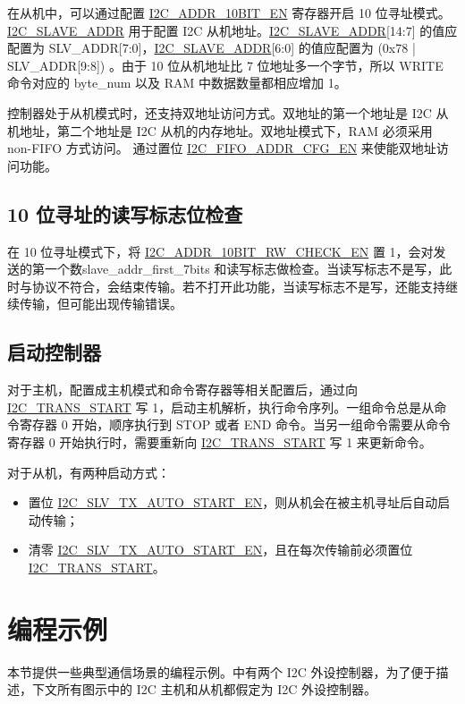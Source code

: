 \documentclass[main\_\_CN.tex]{subfiles}
\begin{document}
在从机中，可以通过配置 \hyperref[fielddesc:I2CADDR10BITEN]{I2C\_ADDR\_10BIT\_EN} 寄存器开启 10 位寻址模式。 \hyperref[fielddesc:I2CSLAVEADDR]{I2C\_SLAVE\_ADDR} 用于配置 I2C 从机地址。\hyperref[fielddesc:I2CSLAVEADDR]{I2C\_SLAVE\_ADDR}[14:7] 的值应配置为 SLV\_ADDR[7:0]，\hyperref[fielddesc:I2CSLAVEADDR]{I2C\_SLAVE\_ADDR}[6:0] 的值应配置为 (0x{}78 | SLV\_ADDR[9:8]) 。由于 10 位从机地址比 7 位地址多一个字节，所以 WRITE 命令对应的 byte\_num 以及 RAM 中数据数量都相应增加 1。

控制器处于从机模式时，还支持双地址访问方式。双地址的第一个地址是 I2C 从机地址，第二个地址是 I2C 从机的内存地址。双地址模式下，RAM 必须采用 non-FIFO 方式访问。
通过置位 \hyperref[fielddesc:I2CFIFOADDRCFGEN]{I2C\_FIFO\_ADDR\_CFG\_EN} 来使能双地址访问功能。

\subsection{10 位寻址的读写标志位检查}
在 10 位寻址模式下，将 \hyperref[fielddesc:I2CADDR10BITRWCHECKEN]{I2C\_ADDR\_10BIT\_RW\_CHECK\_EN} 置 1，会对发送的第一个数slave\_addr\_first\_7bits 和读写标志做检查。当读写标志不是写，此时与协议不符合，会结束传输。若不打开此功能，当读写标志不是写，还能支持继续传输，但可能出现传输错误。

\subsection{启动控制器}
\label{subsubsec:i2c-start}
对于主机，配置成主机模式和命令寄存器等相关配置后，通过向 \hyperref[fielddesc:I2CTRANSSTART]{I2C\_TRANS\_START} 写 1，启动主机解析，执行命令序列。一组命令总是从命令寄存器 0 开始，顺序执行到 STOP 或者 END 命令。当另一组命令需要从命令寄存器 0 开始执行时，需要重新向 \hyperref[fielddesc:I2CTRANSSTART]{I2C\_TRANS\_START} 写 1 来更新命令。

对于从机，有两种启动方式：
\begin{itemize}
    \item 置位 \hyperref[fielddesc:I2CSLVTXAUTOSTARTEN]{I2C\_SLV\_TX\_AUTO\_START\_EN}，则从机会在被主机寻址后自动启动传输；
    \item 清零 \hyperref[fielddesc:I2CSLVTXAUTOSTARTEN]{I2C\_SLV\_TX\_AUTO\_START\_EN}，且在每次传输前必须置位 \hyperref[fielddesc:I2CTRANSSTART]{I2C\_TRANS\_START}。
\end{itemize}

\section{编程示例}
本节提供一些典型通信场景的编程示例。\chipname{}中有两个 I2C 外设控制器，为了便于描述，下文所有图示中的 I2C 主机和从机都假定为\chipname{} I2C 外设控制器。
\end{document}
